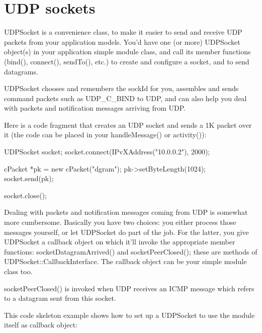 \section{UDP sockets}

UDPSocket is a convenience class, to make it easier to send and receive
UDP packets from your application models. You'd have one (or more)
UDPSocket object(s) in your application simple module class, and call
its member functions (bind(), connect(), sendTo(), etc.) to create and
configure a socket, and to send datagrams.

UDPSocket chooses and remembers the sockId for you, assembles and sends command
packets such as UDP\_C\_BIND to UDP, and can also help you deal with packets and
notification messages arriving from UDP.

Here is a code fragment that creates an UDP socket and sends a 1K packet
over it (the code can be placed in your handleMessage() or activity()):

\begin{cpp}
UDPSocket socket;
socket.connect(IPvXAddress("10.0.0.2"), 2000);

cPacket *pk = new cPacket("dgram");
pk->setByteLength(1024);
socket.send(pk);

socket.close();
\end{cpp}



Dealing with packets and notification messages coming from UDP is somewhat
more cumbersome. Basically you have two choices: you either process those
messages yourself, or let UDPSocket do part of the job. For the latter,
you give UDPSocket a callback object on which it'll invoke the appropriate
member functions: socketDatagramArrived() and socketPeerClosed(); these are
methods of UDPSocket::CallbackInterface. The callback object can be your
simple module class too.

socketPeerClosed() is invoked when UDP receives an ICMP message which
refers to a datagram sent from this socket.

This code skeleton example shows how to set up a UDPSocket to use the module
itself as callback object:

